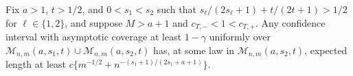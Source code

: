 Fix \(a>1\), \(t>1/2\), and \(0<s_1<s_2\) such that \(s_\ell/(2s_\ell+1)+t/(2t+1)>1/2\) for \(\ell\in\{1,2\}\), and suppose \(M>a+1\) and \(c_{T,-}<1<c_{T,+}\). Any confidence interval with asymptotic coverage at least \(1-\gamma\) uniformly over \(\mathcal M_{n,m}(a,s_1,t)\cup\mathcal M_{n,m}(a,s_2,t)\) has, at some law in \(\mathcal M_{n,m}(a,s_2,t)\), expected length at least \(c\{m^{-1/2}+n^{-(s_1+1)/(2s_1+a+1)}\}\).